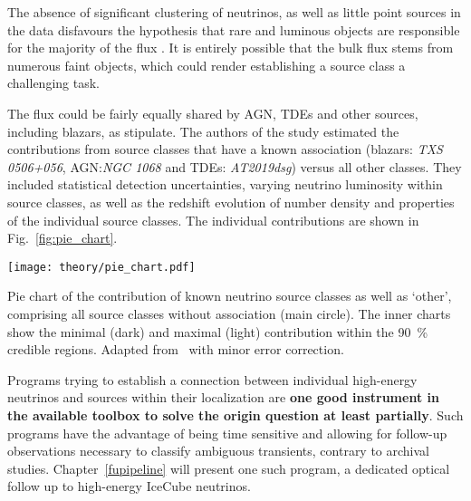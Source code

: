 The absence of significant clustering of neutrinos, as well as little point sources in the data disfavours the hypothesis that rare and luminous objects are responsible for the majority of the flux . It is entirely possible that the bulk flux stems from numerous faint objects, which could render establishing a source class a challenging task.

The flux could be fairly equally shared by AGN, TDEs and other sources, including blazars, as  stipulate. The authors of the study estimated the contributions from source classes that have a known association (blazars: \emph{TXS 0506+056}, AGN:\@ \emph{NGC 1068} and TDEs: \emph{AT2019dsg}) versus all other classes. They included statistical detection uncertainties, varying neutrino luminosity within source classes, as well as the redshift evolution of number density and properties of the individual source classes. The individual contributions are shown in Fig.~\ref{fig:pie_chart}.

\begin{marginfigure}
    \texttt{[image: theory/pie\_chart.pdf]}
    \caption[Neutrino flux contribution pie chart]{Pie chart of the contribution of known neutrino source classes as well as `other', comprising all source classes without association (main circle). The inner charts show the minimal (dark) and maximal (light) contribution within the \SI{90}{\percent} credible regions. Adapted from~\cite{Bartos2021} with minor error correction.}
\end{marginfigure}

Programs trying to establish a connection between individual high-energy neutrinos and sources within their localization are \textbf{one good instrument in the available toolbox to solve the origin question at least partially}. Such programs have the advantage of being time sensitive and allowing for follow-up observations necessary to classify ambiguous transients, contrary to archival studies. Chapter~\ref{fupipeline} will present one such program, a dedicated optical follow up to high-energy IceCube neutrinos.


